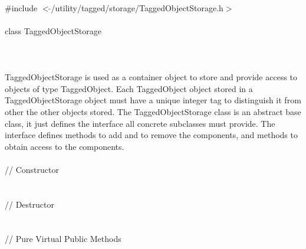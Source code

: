 
   \\
\indent \#include $<\tilde{ }$/utility/tagged/storage/TaggedObjectStorage.h$>$ \\

  \\
\indent class TaggedObjectStorage  \\

 \\
 \\

  \\
\indent TaggedObjectStorage is used as a container object to store and
provide access to objects of type TaggedObject. Each TaggedObject
object stored in a TaggedObjectStorage object must have a unique
integer tag to distinguish it from other the other objects stored. The
TaggedObjectStorage class is an abstract base class, it just defines
the interface all concrete subclasses must provide. The interface
defines methods to add and to remove the components, and methods to
obtain access to the components. \\

  \\
\indent // Constructor  \\
 \\\\
\indent // Destructor \\
 \\  \\
\indent // Pure Virtual Public Methods \\
\\
\\
\\
\\
\\
\\
\\
\\
\\

